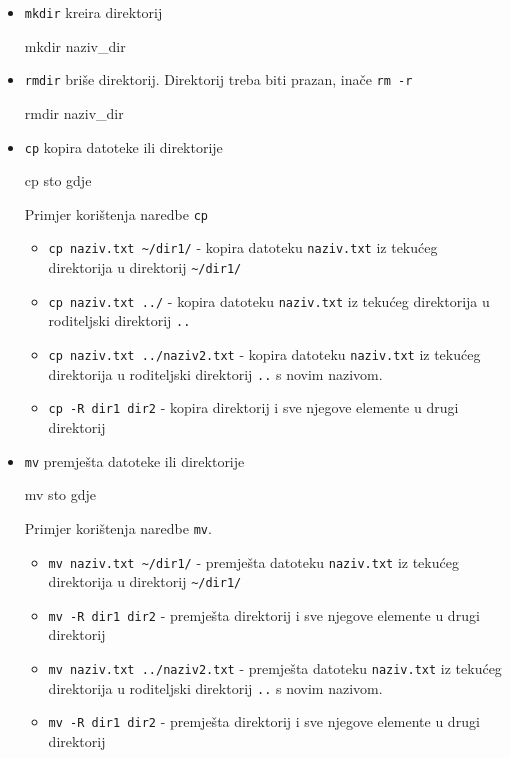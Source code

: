 \begin{itemize}
\item \texttt{mkdir} kreira direktorij
\begin{prototip}
mkdir naziv_dir 
\end{prototip}

\item \texttt{rmdir} briše direktorij. Direktorij treba biti prazan, inače \texttt{rm -r}
\begin{prototip}
rmdir naziv_dir 
\end{prototip}


\item \texttt{cp} kopira datoteke ili direktorije
\begin{prototip}
cp sto gdje 
\end{prototip}

\begin{primjer} Primjer korištenja naredbe \texttt{cp}
\begin{itemize}
 \item \lstinline!cp naziv.txt ~/dir1/! - kopira datoteku \texttt{naziv.txt} iz tekućeg direktorija u direktorij \lstinline!~/dir1/!
\item \lstinline!cp naziv.txt ../! - kopira datoteku \texttt{naziv.txt} iz tekućeg direktorija u roditeljski direktorij \texttt{..}
\item \lstinline!cp naziv.txt ../naziv2.txt! - kopira datoteku \texttt{naziv.txt} iz tekućeg direktorija u roditeljski direktorij \texttt{..} s novim nazivom.
 \item \lstinline!cp -R dir1 dir2! - kopira direktorij i sve njegove elemente u drugi direktorij 
\end{itemize}
\end{primjer}

\item \texttt{mv} premješta datoteke ili direktorije
\begin{prototip}
mv sto gdje
\end{prototip}

\begin{primjer} Primjer korištenja naredbe \texttt{mv}.
\begin{itemize}
 \item \lstinline!mv naziv.txt ~/dir1/! - premješta datoteku \texttt{naziv.txt} iz tekućeg direktorija u direktorij \lstinline!~/dir1/!
 \item \lstinline!mv -R dir1 dir2! - premješta direktorij i sve njegove elemente u drugi direktorij 
\item \lstinline!mv naziv.txt ../naziv2.txt! - premješta datoteku \texttt{naziv.txt} iz tekućeg direktorija u roditeljski direktorij \texttt{..} s novim nazivom.
 \item \lstinline!mv -R dir1 dir2! - premješta direktorij i sve njegove elemente u drugi direktorij 
\end{itemize}
\end{primjer}

\end{itemize}

